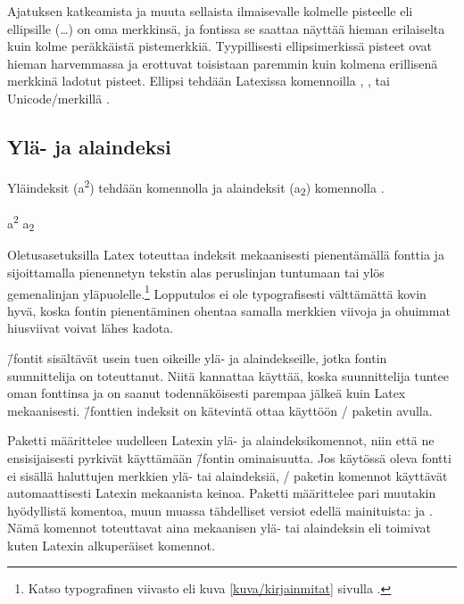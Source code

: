 Ajatuksen katkeamista ja muuta sellaista ilmaisevalle kolmelle pisteelle
eli ellipsille (\ldots) on oma merkkinsä, ja fontissa se saattaa näyttää
hieman erilaiselta kuin kolme peräkkäistä pistemerkkiä. Tyypillisesti
ellipsimerkissä pisteet ovat hieman harvemmassa ja erottuvat toisistaan
paremmin kuin kolmena erillisenä merkkinä ladotut pisteet. Ellipsi
tehdään Latexissa komennoilla , ,
 tai Unicode\-/merkillä .

\subsection{Ylä- ja alaindeksi}
\label{luku/ylä-alaindeksit}

Yläindeksit (a\textsuperscript{2}) tehdään komennolla
 ja alaindeksit (a\textsubscript{2})
komennolla .

\begin{koodilohkosis}
a\textsuperscript{2} a\textsubscript{2}
\end{koodilohkosis}

\noindent
Oletusasetuksilla Latex toteuttaa indeksit mekaanisesti pienentämällä
fonttia ja sijoittamalla pienennetyn tekstin alas peruslinjan tuntumaan
tai ylös gemenalinjan yläpuolelle.\footnote{Katso typografinen viivasto
  eli kuva \ref{kuva/kirjainmitat} sivulla \pageref{kuva/kirjainmitat}.}
Lopputulos ei ole typografisesti välttämättä kovin hyvä, koska fontin
pienentäminen ohentaa samalla merkkien viivoja ja ohuimmat hiusviivat
voivat lähes kadota.

 \=/fontit sisältävät usein tuen oikeille ylä- ja
alaindekseille, jotka fontin suunnittelija on toteuttanut. Niitä
kannattaa käyttää, koska suunnittelija tuntee oman fonttinsa ja on
saanut todennäköisesti parempaa jälkeä kuin Latex mekaanisesti.
 \=/fonttien indeksit on kätevintä ottaa käyttöön
\-/ paketin avulla.

Paketti  määrittelee uudelleen Latexin ylä- ja
alaindeksikomennot, niin että ne ensisijaisesti pyrkivät käyttämään
 \=/fontin ominaisuutta. Jos käytössä oleva fontti
ei sisällä haluttujen merkkien ylä- tai alaindeksiä,
\-/ paketin komennot käyttävät automaattisesti
Latexin mekaanista keinoa. Paketti määrittelee pari muutakin hyödyllistä
komentoa, muun muassa tähdelliset versiot edellä mainituista:
 ja . Nämä komennot
toteuttavat aina mekaanisen ylä- tai alaindeksin eli toimivat kuten
Latexin alkuperäiset komennot.

